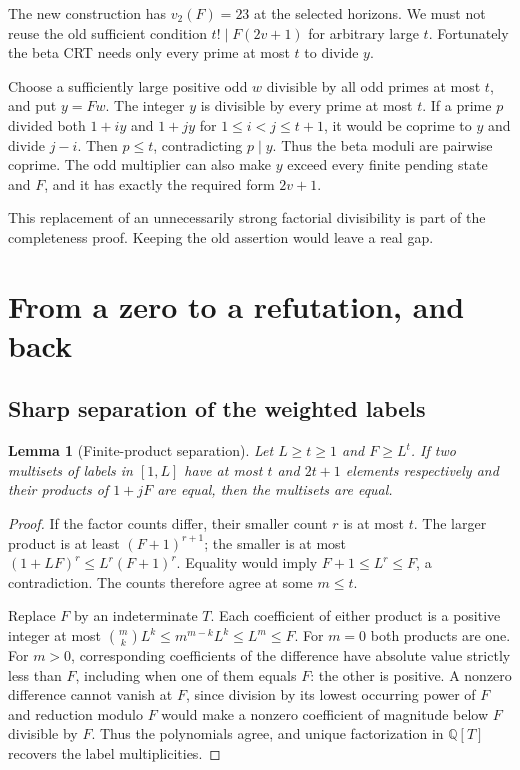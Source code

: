 \documentclass[11pt,a4paper]{article}
\newtheorem{lemma}[theorem]{Lemma}
\theoremstyle{remark}\newtheorem{remark}[theorem]{Remark}
\newcommand{\vp}{v_2}
\begin{document}
The new construction has $\vp(F)=23$ at the selected horizons. We must not
reuse the old sufficient condition $t!\mid F(2v+1)$ for arbitrary large $t$.
Fortunately the beta CRT needs only every prime at most $t$ to divide $y$.

Choose a sufficiently large positive odd $w$ divisible by all odd primes at
most $t$, and put $y=Fw$. The integer $y$ is divisible by every prime at
most $t$. If a prime $p$ divided both $1+iy$ and $1+jy$ for
$1\le i<j\le t+1$, it would be coprime to $y$ and divide $j-i$.
Then $p\le t$, contradicting $p\mid y$. Thus the beta moduli are pairwise
coprime. The odd multiplier can also make $y$ exceed every finite pending
state and $F$, and it has exactly the required form $2v+1$.

This replacement of an unnecessarily strong factorial divisibility is part
of the completeness proof. Keeping the old assertion would leave a real gap.

\section{From a zero to a refutation, and back}\label{sec:calibration}

\subsection{Sharp separation of the weighted labels}

\begin{lemma}[Finite-product separation]\label{lem:separation}
Let $L\ge t\ge1$ and $F\ge L^t$. If two multisets of labels in $[1,L]$
have at most $t$ and $2t+1$ elements respectively and their products of
$1+jF$ are equal, then the multisets are equal.
\end{lemma}
\begin{proof}
If the factor counts differ, their smaller count $r$ is at most $t$.
The larger product is at least $(F+1)^{r+1}$; the smaller is at most
$(1+LF)^r\le L^r(F+1)^r$. Equality would imply
$F+1\le L^r\le F$, a contradiction. The counts therefore agree at some
$m\le t$.

Replace $F$ by an indeterminate $T$. Each coefficient of either product
is a positive integer at most
$\binom mk L^k\le m^{m-k}L^k\le L^m\le F$.
For $m=0$ both products are one. For $m>0$, corresponding coefficients of
the difference have absolute value strictly less than $F$, including when
one of them equals $F$: the other is positive. A nonzero difference cannot
vanish at $F$, since division by its lowest occurring power of $F$ and
reduction modulo $F$ would make a nonzero coefficient of magnitude below
$F$ divisible by $F$. Thus the polynomials agree, and unique factorization
in $\mathbb Q[T]$ recovers the label multiplicities.
\end{proof}
\end{document}
